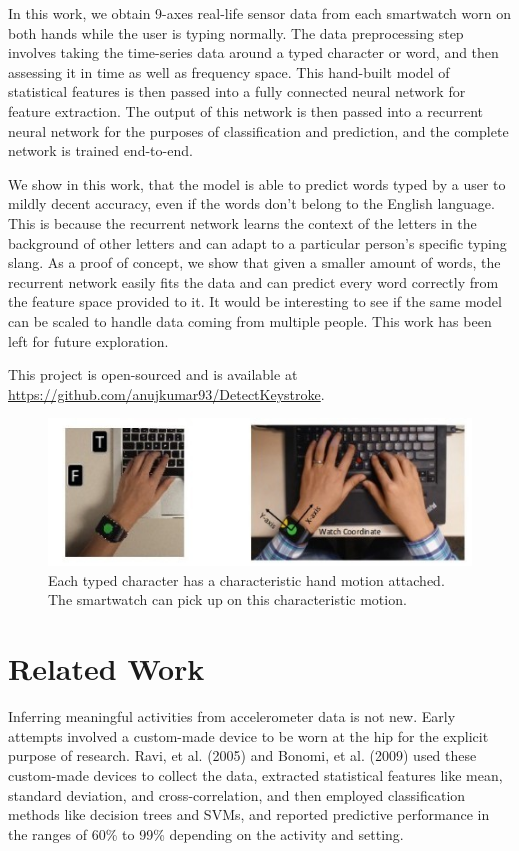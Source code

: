 \documentclass[10pt,twocolumn,letterpaper]{article}
\begin{document}
In this work, we obtain 9-axes real-life sensor data from each smartwatch worn on both hands while the user is typing normally. The data preprocessing step involves taking the time-series data around a typed character or word, and then assessing it in time as well as frequency space. This hand-built model of statistical features is then passed into a fully connected neural network for feature extraction. The output of this network is then passed into a recurrent neural network for the purposes of classification and prediction, and the complete network is trained end-to-end.

We show in this work, that the model is able to predict words typed by a user to mildly decent accuracy, even if the words don't belong to the English language. This is because the recurrent network learns the context of the letters in the background of other letters and can adapt to a particular person's specific typing slang. As a proof of concept, we show that given a smaller amount of words, the recurrent network easily fits the data and can predict every word correctly from the feature space provided to it. It would be interesting to see if the same model can be scaled to handle data coming from multiple people. This work has been left for future exploration.

This project is open-sourced and is available at \url{https://github.com/anujkumar93/DetectKeystroke}.
\begin{figure}[t]
\begin{center}
   \includegraphics[width=0.99\linewidth]{./sample_image.jpg}
\end{center}
   \caption{Each typed character has a characteristic hand motion attached. The smartwatch can pick up on this characteristic motion.\cite{wang}\cite{maiti}}
\label{fig:sample}
\end{figure}

\section{Related Work}
Inferring meaningful activities from accelerometer data is not new. Early attempts involved a custom-made device to be worn at the hip for the explicit purpose of research. Ravi, et al. (2005)\cite{ravi} and Bonomi, et al. (2009)\cite{bonomi} used these custom-made devices to collect the data, extracted statistical features like mean, standard deviation, and cross-correlation, and then employed classification methods like decision trees and SVMs, and reported predictive performance in the ranges of 60\% to 99\% depending on the activity and setting.
\end{document}
